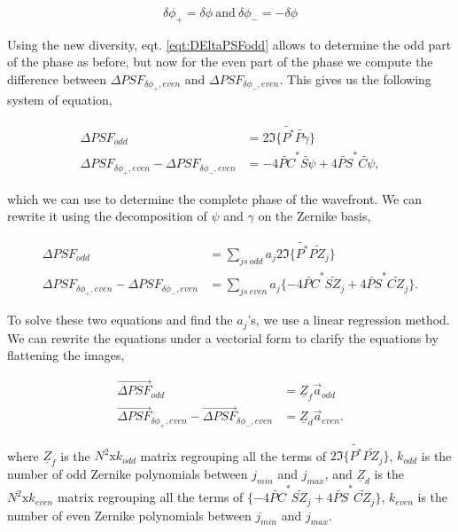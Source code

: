 \begin{equation}
\delta\phi_+ = \delta\phi \mathrm{\ and \ } \delta\phi_- = -\delta\phi
\label{eqt:diversities}
\end{equation}

Using the new diversity, eqt. \eqref{eqt:DEltaPSFodd} allows to determine the odd part of the phase as before, but now for the even part of the phase we compute the difference between $\Delta PSF_{\delta\phi_+,even}$ and $\Delta PSF_{\delta\phi_-,even}$. This gives us the following system of equation,

\begin{align}
\Delta PSF_{odd} &= 2\Im\lbrace \widetilde{P^*}\widetilde{P \gamma}\rbrace \\
\Delta PSF_{\delta\phi_+, even}-\Delta PSF_{\delta\phi_-, even} &= -4\widetilde{PC}^*\widetilde{S\psi} +4\widetilde{PS}^*\widetilde{C\psi},
\end{align}

which we can use to determine the complete phase of the wavefront. We can rewrite it using the decomposition of $\psi$ and $\gamma$ on the Zernike basis,

\begin{align}
\Delta PSF_{odd} &= \sum\limits_{js\ odd} a_j 2\Im\lbrace \widetilde{P^*}\widetilde{P Z_j}\rbrace \label{eqt:DeltaPSFoddonZernike}\\
\Delta PSF_{\delta\phi_+, even}-\Delta PSF_{\delta\phi_-, even} &= \sum\limits_{js\ even} a_j \lbrace-4\widetilde{PC}^*\widetilde{SZ_j} +4\widetilde{PS}^*\widetilde{CZ_j}\rbrace.\label{eqt:DeltaPSF+-DeltaPSF-evenonZernike}
\end{align}

To solve these two equations and find the $a_j$'s, we use a linear regression method. We can rewrite the equations under a vectorial form to clarify the equations by flattening the images,

\begin{align}
\overrightarrow{\Delta PSF}_{odd} &= \underline{Z}_f\vec{a}_{odd}  \label{eqt:DeltaPSFoddonZernikeMAtrix}\\
\overrightarrow{\Delta PSF}_{\delta\phi_+, even}-\overrightarrow{\Delta PSF}_{\delta\phi_-, even} &= \underline{Z}_d \vec{a}_{even}.\label{eqt:DeltaPSF+-DeltaPSF-evenonZernikeMatrix}
\end{align}

where $\underline{Z}_f$ is the $N^2 \mathrm{x} k_{odd}$ matrix regrouping all the terms of $2\Im\lbrace \widetilde{P^*}\widetilde{P Z_j}\rbrace$, $k_{odd}$ is the number of odd Zernike polynomials between $j_{min}$ and $j_{max}$, and $\underline{Z}_d$ is the $N^2 \mathrm{x} k_{even}$ matrix regrouping all the terms of $\lbrace-4\widetilde{PC}^*\widetilde{SZ_j} +4\widetilde{PS}^*\widetilde{CZ_j}\rbrace$, $k_{even}$ is the number of even Zernike polynomials between $j_{min}$ and $j_{max}$.

